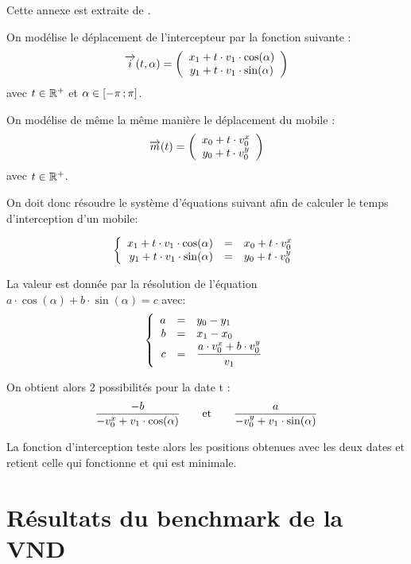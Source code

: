 	Cette annexe est extraite de \cite{projet-zz1}.

	On modélise le déplacement de l'intercepteur par la fonction suivante : 
	\[
	\overrightarrow{i}(t,\alpha) = 
	\left(
	\begin{array}{c}
	 x_1 + t \cdot v_1 \cdot \cos(\alpha)\\
	 y_1 + t \cdot v_1 \cdot \sin(\alpha)
	\end{array}
	\right)
	\]
	avec $t \in \mathbb{R}^+$ et $\alpha \in \mathopen{[}-\pi\mathclose{}\mathpunct{};\pi\mathclose{]}$.

	On modélise de même la même manière le déplacement du mobile :
	\[
	\overrightarrow{m}(t) = 
	\left(
	\begin{array}{c}
	 x_0 + t \cdot v^{x}_0\\
	 y_0 + t \cdot v^{y}_0
	\end{array}
	\right)
	\]
	avec $t \in \mathbb{R}^+$.

	On doit donc résoudre le système d'équations suivant afin de calculer le temps d'interception d'un mobile:

	\[
	\left\{
	\begin{array}{r c l}
	x_1 + t \cdot v_1 \cdot \cos(\alpha) &=& x_0 + t \cdot v^{x}_0\\
	y_1 + t \cdot v_1 \cdot \sin(\alpha) &=& y_0 + t \cdot v^{y}_0
	\end{array}
	\right.
	\]

	La valeur est donnée par la résolution de l'équation $a \cdot \cos(\alpha)+b \cdot \sin(\alpha) = c$ avec:
	\[
	\left\{
	\begin{array}{r c l}
	a &=& y_0 - y_1\\
	b &=& x_1 - x_0\\
	c &=& \displaystyle \frac{a \cdot v^{x}_0 +b \cdot v^{y}_0}{v_1}
	\end{array}
	\right.
	\]

	On obtient alors 2 possibilités pour la date t : 
	\[ \frac{-b}{-v^{x}_0 + v_1 \cdot \cos(\alpha)}  \qquad\text{et}\qquad \frac{a}{-v^{y}_0 + v_1 \cdot \sin(\alpha)} \]

	La fonction d'interception teste alors les positions obtenues avec les deux dates et retient celle qui fonctionne et qui est minimale.
	
\chapter{Résultats du benchmark de la VND}


